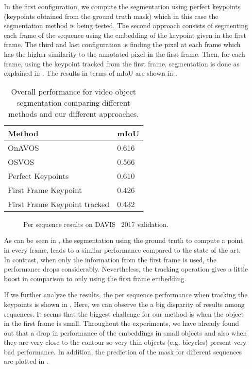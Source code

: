 In the first configuration, we compute the segmentation using perfect keypoints (keypoints obtained from the ground truth mask) which in this case the segmentation method is being tested.
The second approach consists of segmenting each frame of the sequence using the embedding of the keypoint given in the first frame.
The third and last configuration is finding the pixel at each frame which has the higher similarity to the annotated pixel in the first frame.
Then, for each frame, using the keypoint tracked from the first frame, segmentation is done as explained in .
The results in terms of mIoU are shown in .

\begin{table}[h]
  \centering
  \begin{tabular}{l|l}
    \toprule
    Method                       & mIoU  \\
    \midrule
    OnAVOS~\onavos{}             & 0.616 \\
    OSVOS~\osvos{}               & 0.566 \\
    \midrule
    Perfect Keypoints            & 0.610 \\
    First Frame Keypoint         & 0.426 \\
    First Frame Keypoint tracked & 0.432 \\
    \bottomrule
  \end{tabular}
  \caption{Overall performance for video object segmentation comparing different methods and our different approaches. }
  \label{tab:experiments:videosegmentation:davismiou}
\end{table}

\begin{figure}[H]
  \centering
  
  \caption{Per sequence results on DAVIS~\davislast{} 2017 validation. }
  \label{fig:experiments:videosegmentation:persequencemiou}
\end{figure}

As can be seen in , the segmentation using the ground truth to compute a point in every frame, leads to a similar performance compared to the state of the art.
In contrast, when only the information from the first frame is used, the performance drops considerably.
Nevertheless, the tracking operation gives a little boost in comparison to only using the first frame embedding.

If we further analyze the results, the per sequence performance when tracking the keypoints is shown in .
Here, we can observe the a big disparity of results among sequences.
It seems that the biggest challenge for our method is when the object in the first frame is small.
Throughout the experiments, we have already found out that a drop in performance of the embeddings in small objects and also when they are very close to the contour so very thin objects (e.g. bicycles) present very bad performance.
In addition, the prediction of the mask for different sequences are plotted in .


